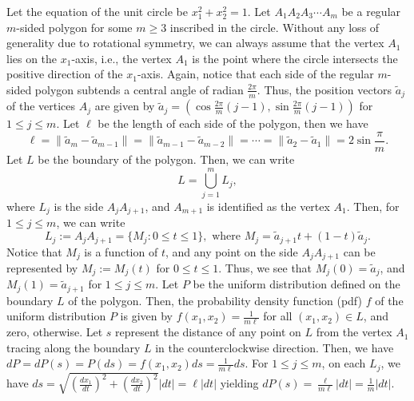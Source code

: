 \documentclass[12pt]{amsart}
\theoremstyle{plain}
\theoremstyle{definition}
\newcommand{\UU}{\bigcup}%
\newcommand{\set}[1]{\{#1\}}%
\newcommand{\te}{\text}%
\newcommand{\tl}{\tilde}
\begin{document}
Let the equation of the unit circle be $x_1^2+x_2^2=1$. Let $A_1A_2A_3\cdots A_m$ be a regular $m$-sided polygon for some $m\geq 3$ inscribed in the circle. Without any loss of generality due to rotational symmetry, we can always assume that the vertex $A_1$ lies on the $x_1$-axis, i.e., the vertex $A_1$ is the point where the circle intersects the positive direction of the $x_1$-axis. Again, notice that each side of the regular $m$-sided polygon subtends a central angle of radian $\frac {2\pi}m$. Thus, the position vectors $\tilde a_j$ of the vertices $A_j$ are given by $\tilde a_j=(\cos \frac{2 \pi }{m} (j-1), \sin\frac{2 \pi }{m} (j-1))$ for $1\leq j\leq m$. Let $\ell$ be the length of each side of the polygon, then we have
\begin{equation} \label{eq100} \ell=\|\tilde a_m-\tilde a_{m-1}\|=\|\tilde a_{m-1}-\tilde a_{m-2}\|=\cdots=\|\tilde a_2-\tilde a_1\|=2 \sin \frac{\pi }{m}.
\end{equation}
Let $L$ be the boundary of the polygon. Then, we can write
\[L=\UU_{j=1}^m L_j,\]
where $L_j$ is the side $A_jA_{j+1}$, and $A_{m+1}$ is identified as the vertex $A_1$. Then, for $1\leq j\leq m$, we can write
\[L_j:=A_jA_{j+1}=\set{M_j :  0\leq t\leq 1}, \te{ where } M_j=\tl a_{j+1}t+(1-t)\tl a_j.\]
Notice that $M_j$ is a function of $t$, and any point on the side $A_jA_{j+1}$ can be represented by $M_j:=M_j(t)$ for $0\leq t\leq 1$. Thus, we see that $M_j(0)=\tilde a_j$, and $M_j(1)=\tilde a_{j+1}$ for $1\leq j\leq m$.
Let $P$ be the uniform distribution defined on the boundary $L$ of the polygon. Then, the probability density function (pdf) $f$ of the uniform distribution $P$ is given by $f(x_1, x_2)=\frac 1{m\ell}$ for all $(x_1, x_2)\in L$, and zero, otherwise.
Let $s$ represent the distance of any point on $L$ from the vertex $A_1$ tracing along the boundary $L$ in the counterclockwise direction. Then, we have $dP=dP(s)=P(ds)=f(x_1, x_2) ds=\frac 1 {m\ell} ds$. For $1\leq j\leq m$, on each $L_j$,  we have $ds=\sqrt{(\frac {dx_1}{dt})^2 +(\frac {dx_2}{dt})^2}|dt|=\ell |dt|$ yielding $dP(s)=\frac \ell{m\ell} |dt|=\frac 1m |dt|$.
\end{document}
